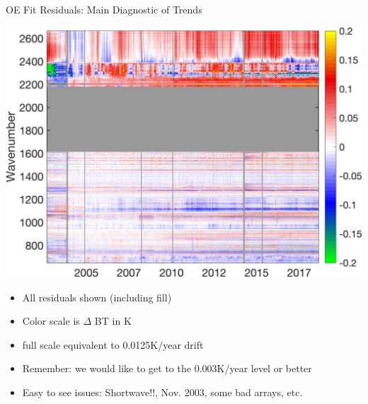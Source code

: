\documentclass[10pt,t]{beamer}
\begin{document}
\begin{frame}[label={sec:org79ecc5e}]{OE Fit Residuals:  Main Diagnostic of Trends}
\vspace{-0.1in}
\begin{center}
\includegraphics[width=0.7\linewidth]{./Figs/Png/best_co2_anom_resid.png}
\end{center}

\vspace{-0.1in}
\begin{footnotesize}
\begin{itemize}
\item All residuals shown (including fill)
\item Color scale is \(\Delta\) BT in K
\item \textpm{} full scale equivalent to \textpm{} 0.0125K/year drift
\item Remember: we would like to get to the 0.003K/year level or better
\item Easy to see issues: Shortwave!!, Nov. 2003, some bad arrays, etc.
\end{itemize}

\end{footnotesize}
\end{frame}
\end{document}
